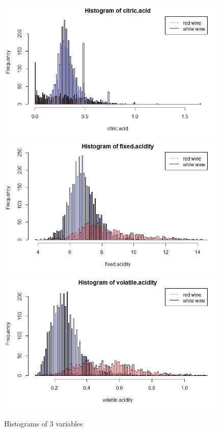 \documentclass[10pt]{article}
\begin{document}
\begin{figure}[H]
\centering
\caption{Histograms of 3 variables}
\includegraphics[scale=0.3]{histogram_of_citricacidity}
\includegraphics[scale=0.3]{histogram_of_fixedacidity}
\includegraphics[scale=0.3]{histogram_of_volatileacidity}
\end{figure}
\end{document}
